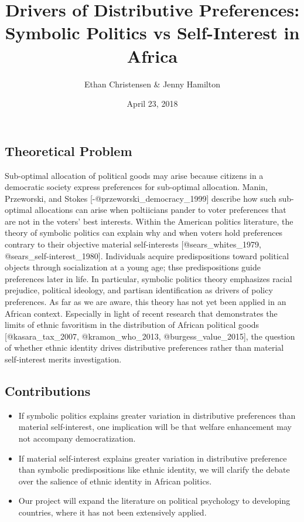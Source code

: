\documentclass[]{article}
\title{Drivers of Distributive Preferences: Symbolic Politics vs Self-Interest
in Africa}
\author{Ethan Christensen \& Jenny Hamilton}
\date{April 23, 2018}
\begin{document}
\maketitle

\subsection{Theoretical Problem}\label{theoretical-problem}

Sub-optimal allocation of political goods may arise because citizens in
a democratic society express preferences for sub-optimal allocation.
Manin, Przeworski, and Stokes {[}-@przeworski\_democracy\_1999{]}
describe how such sub-optimal allocations can arise when poltiicians
pander to voter preferences that are not in the voters' best interests.
Within the American politics literature, the theory of symbolic politics
can explain why and when voters hold preferences contrary to their
objective material self-interests {[}@sears\_whites\_1979,
@sears\_self-interest\_1980{]}. Individuals acquire predispositions
toward political objects through socialization at a young age; thse
predispositions guide preferences later in life. In particular, symbolic
politics theory emphasizes racial prejudice, political ideology, and
partisan identification as drivers of policy preferences. As far as we
are aware, this theory has not yet been applied in an African context.
Especially in light of recent research that demonstrates the limits of
ethnic favoritism in the distribution of African political goods
{[}@kasara\_tax\_2007, @kramon\_who\_2013, @burgess\_value\_2015{]}, the
question of whether ethnic identity drives distributive preferences
rather than material self-interest merits investigation.

\subsection{Contributions}\label{contributions}

\begin{itemize}
\item If symbolic politics explains greater variation in distributive preferences than material self-interest, one implication will be that welfare enhancement may not accompany democratization.
\item If material self-interest explains greater variation in distributive preference than symbolic predispositions like ethnic identity, we will clarify the debate over the salience of ethnic identity in African politics.
\item Our project will expand the literature on political psychology to developing countries, where it has not been extensively applied.
\end{itemize}
\end{document}
